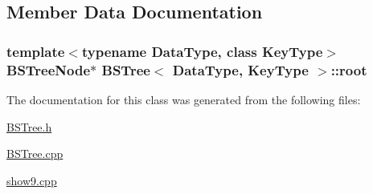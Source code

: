 \subsection{\-Member \-Data \-Documentation}
\hypertarget{class_b_s_tree_a83534afce9094181ac031f9f596a8625}{
\subsubsection[{root}]{\setlength{\rightskip}{0pt plus 5cm}template$<$typename \-Data\-Type, class \-Key\-Type$>$ {\bf \-B\-S\-Tree\-Node}$\ast$ {\bf \-B\-S\-Tree}$<$ \-Data\-Type, \-Key\-Type $>$\-::{\bf root}}}\label{class_b_s_tree_a83534afce9094181ac031f9f596a8625}


\-The documentation for this class was generated from the following files\-:\begin{DoxyCompactItemize}
\item 
\hyperlink{_b_s_tree_8h}{\-B\-S\-Tree.\-h}\item 
\hyperlink{_b_s_tree_8cpp}{\-B\-S\-Tree.\-cpp}\item 
\hyperlink{show9_8cpp}{show9.\-cpp}\end{DoxyCompactItemize}
